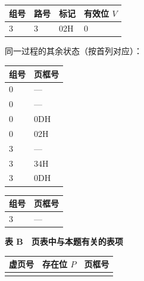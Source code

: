 \begin{example}[配套例题]
\begin{wideblock}\par\medskip\noindent\begin{minipage}{\linewidth}\fontsize{9.3}{12}\selectfont\begin{tabularx}{\linewidth}{@{}YYYY@{}}
\toprule\noalign{}
组号 & 路号 & 标记 & 有效位 \(V\) \\
\midrule\noalign{}


3 & 3 & 02H & 0 \\
\bottomrule\end{tabularx}
\end{minipage}\par\medskip\end{wideblock}

同一过程的其余状态（按首列对应）：

\par\medskip\noindent\begin{minipage}{\linewidth}\fontsize{9.3}{12}\selectfont\begin{tabularx}{\linewidth}{@{}YY@{}}
\toprule\noalign{}
组号 & 页框号 \\
\midrule\noalign{}


0 & --- \\
0 & --- \\
0 & 0DH \\
0 & 02H \\
3 & --- \\
3 & 34H \\
3 & 0DH \\
\bottomrule\end{tabularx}
\end{minipage}\par\medskip

\par\medskip\noindent\begin{minipage}{\linewidth}\fontsize{9.3}{12}\selectfont\begin{tabularx}{\linewidth}{@{}YY@{}}
\toprule\noalign{}
组号 & 页框号 \\
\midrule\noalign{}


3 & --- \\
\bottomrule\end{tabularx}
\end{minipage}\par\medskip

\textbf{表 B　页表中与本题有关的表项}

\par\medskip\noindent\begin{minipage}{\linewidth}\fontsize{9.3}{12}\selectfont\begin{tabularx}{\linewidth}{@{}YYY@{}}
\toprule\noalign{}
虚页号 & 存在位 \(P\) & 页框号 \\
\midrule\noalign{}



\end{tabularx}
\end{minipage}
\end{example}
